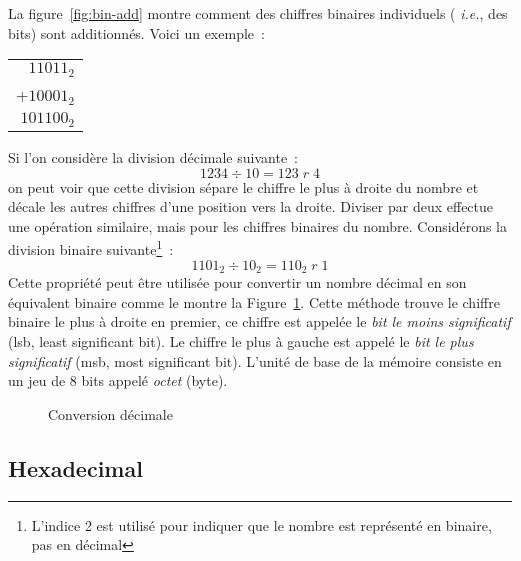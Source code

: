 La figure~\ref{fig:bin-add} montre comment des chiffres binaires individuels ({\em
i.e.}, des bits) sont additionnés. Voici un exemple~:

\begin{tabular}{r}
 $11011_2$ \\
+$10001_2$ \\
\hline
$101100_2$ \\
\end{tabular}

Si l'on considère la division décimale suivante~:
\[ 1234 \div 10 = 123\; r\; 4 \]
on peut voir que cette division sépare le chiffre le plus à droite du nombre
et décale les autres chiffres d'une position vers la droite. Diviser par deux
effectue une opération similaire, mais pour les chiffres binaires du nombre.
Considérons la division binaire suivante\footnote{L'indice 2 est utilisé
pour indiquer que le nombre est représenté en binaire, pas en décimal}~:
\[ 1101_2 \div 10_2 = 110_2\; r\; 1 \]
Cette propriété peut être utilisée pour convertir un nombre décimal en son
équivalent binaire comme le montre la Figure~\ref{fig:dec-convert}. Cette
méthode trouve le chiffre binaire le plus à droite en premier, ce chiffre
est appelée le \emph{bit le moins significatif} (lsb, least significant bit). 
Le chiffre le plus à gauche est appelé le \emph{bit le plus significatif} (msb, most
significant bit). L'unité de base de la mémoire consiste en un jeu de 8 bits
appelé \emph{octet} (byte).

\begin{figure}[t]
\centering
{}
\caption{Conversion décimale \label{fig:dec-convert}}
\end{figure}

\subsection{Hexadecimal}

